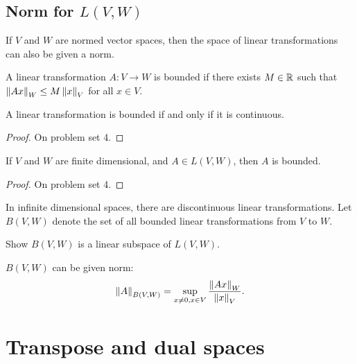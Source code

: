 \subsection{Norm for $L(V,W)$}

If $V$ and $W$ are normed vector spaces, then the space of linear
transformations can also be given a norm.
\begin{definition}
  A linear transformation $A:V \to W$ is bounded if there exists $M
  \in \mathbb{R}$ such that $\left\Vert {Ax} \right\Vert_W \leq M \left\Vert {x} \right\Vert_V$ for all $x \in V$.
\end{definition}
\begin{lemma}
  A linear transformation is bounded if and only if it is continuous. 
\end{lemma}
\begin{proof}
  On problem set 4.
\end{proof}
\begin{lemma}
  If $V$ and $W$ are finite dimensional, and $A \in L(V,W)$, then $A$
  is bounded.
\end{lemma}
\begin{proof}
  On problem set 4.
\end{proof}
In infinite dimensional spaces, there are discontinuous linear
transformations. Let $B(V,W)$ denote the set of all bounded linear
transformations from $V$ to $W$. 
\begin{exercise}
  Show $B(V,W)$ is a linear subspace of $L(V,W)$.
\end{exercise}
$B(V,W)$ can be given norm: 
\[ \left\Vert {A} \right\Vert_{B(V,W)} = \sup_{x \neq 0, x\in V}
\frac{\left\Vert {Ax} \right\Vert_{W}}{\left\Vert {x} \right\Vert_V}. \]

\section{Transpose and dual spaces}

